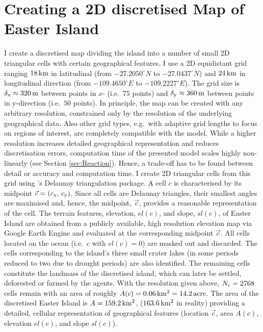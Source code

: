 \section{Creating a 2D discretised Map of Easter Island}\label{sec:CreateMap}
I create a discretised map dividing the island into a number of small 2D triangular cells with certain geographical features.
I use a 2D equidistant grid ranging $18\, {\rm km}$ in latitudinal (from $-27.2050^\circ N$ to $-27.0437^\circ N$) and $24\, {\rm km}$ in longitudinal direction (from  $-109.4650^\circ E$ to 
 $-109.2227^\circ E$).
The grid size is  $\delta_{\rm x} \approx 320\, {\rm m}$ between points in $x$- (i.e.\ $75$ points) and $\delta_{\rm y} \approx 360\, {\rm m}$ between points in y-direction (i.e.\ $50$ points). 
In principle, the map can be created with any arbitrary resolution, constrained only by the resolution of the underlying geographical data. 
Also other grid types, e.g.\ with adaptive grid lengths to focus on regions of interest, are completely compatible with the model. 
While a higher resolution increases detailed geographical representation and reduces discretisation errors, computation time of the presented model scales highly non-linearly (see Section \ref{sec:Reaction}).
Hence, a trade-off has to be found between detail or accuracy and computation time.
I create 2D triangular cells from this grid using \citet{matplotlib}'s Delaunay triangulation package.
A cell $c$ is characterised by its midpoint $\vec{c} = (c_{\rm x},\, c_{\rm y})$. 
Since all cells are Delaunay triangles, their smallest angles are maximised and, hence, the midpoint, $\vec{c}$, provides a reasonable representation of the cell.
The terrain features, elevation, $el(c)$, and slope, $sl(c)$, of Easter Island are obtained from a publicly available, high resolution elevation map \citep{Jarvis2008CIGAR} via Google Earth Engine \citep{gorelick2017google} and evaluated at the corresponding midpoint $\vec{c}$.
All cells located on the ocean (i.e.\ $c$ with $el(c)=0$) are masked out and discarded.
The cells corresponding to the island's three small crater lakes (in some periods reduced to two due to drought periods) are also identified.
The remaining cells constitute the landmass of the discretised island, which can later be settled, deforested or farmed by the agents. 
With the resolution given above, $N_{\rm c} = 2768$ cells remain with an area of roughly $A(c)= 0.06 \, {\rm km^2} = 14.2 \, {\rm acre}$.
The area of the discretised Easter Island is $A=159.2\, {\rm km^2}$, ($163.6\, {\rm km^2}$ in reality) providing a detailed, cellular representation of geographical features (location $\vec{c}$, area $A(c)$, elevation $el(c)$, and slope $sl(c)$).


